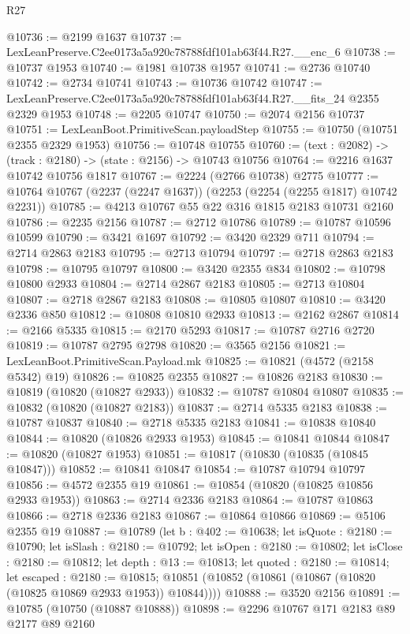 \begin{lexlean}{R27}
\begin{coremodule}
@10736 := @2199 @1637
@10737 := LexLeanPreserve.C2ee0173a5a920c78788fdf101ab63f44.R27.__enc_6
@10738 := @10737 @1953
@10740 := @1981 @10738 @1957
@10741 := @2736 @10740
@10742 := @2734 @10741
@10743 := @10736 @10742
@10747 := LexLeanPreserve.C2ee0173a5a920c78788fdf101ab63f44.R27.__fits_24 @2355 @2329 @1953
@10748 := @2205 @10747
@10750 := @2074 @2156 @10737
@10751 := LexLeanBoot.PrimitiveScan.payloadStep
@10755 := @10750 (@10751 @2355 @2329 @1953)
@10756 := @10748 @10755
@10760 := (text : @2082) -> (track : @2180) -> (state : @2156) -> @10743 @10756
@10764 := @2216 @1637 @10742 @10756 @1817
@10767 := @2224 (@2766 @10738) @2775
@10777 := @10764 @10767 (@2237 (@2247 @1637)) (@2253 (@2254 (@2255 @1817) @10742 @2231))
@10785 := @4213 @10767 @55 @22 @316 @1815 @2183 @10731 @2160
@10786 := @2235 @2156
@10787 := @2712 @10786
@10789 := @10787 @10596 @10599
@10790 := @3421 @1697
@10792 := @3420 @2329 @711
@10794 := @2714 @2863 @2183
@10795 := @2713 @10794
@10797 := @2718 @2863 @2183
@10798 := @10795 @10797
@10800 := @3420 @2355 @834
@10802 := @10798 @10800 @2933
@10804 := @2714 @2867 @2183
@10805 := @2713 @10804
@10807 := @2718 @2867 @2183
@10808 := @10805 @10807
@10810 := @3420 @2336 @850
@10812 := @10808 @10810 @2933
@10813 := @2162 @2867
@10814 := @2166 @5335
@10815 := @2170 @5293
@10817 := @10787 @2716 @2720
@10819 := @10787 @2795 @2798
@10820 := @3565 @2156
@10821 := LexLeanBoot.PrimitiveScan.Payload.mk
@10825 := @10821 (@4572 (@2158 @5342) @19)
@10826 := @10825 @2355
@10827 := @10826 @2183
@10830 := @10819 (@10820 (@10827 @2933))
@10832 := @10787 @10804 @10807
@10835 := @10832 (@10820 (@10827 @2183))
@10837 := @2714 @5335 @2183
@10838 := @10787 @10837
@10840 := @2718 @5335 @2183
@10841 := @10838 @10840
@10844 := @10820 (@10826 @2933 @1953)
@10845 := @10841 @10844
@10847 := @10820 (@10827 @1953)
@10851 := @10817 (@10830 (@10835 (@10845 @10847)))
@10852 := @10841 @10847
@10854 := @10787 @10794 @10797
@10856 := @4572 @2355 @19
@10861 := @10854 (@10820 (@10825 @10856 @2933 @1953))
@10863 := @2714 @2336 @2183
@10864 := @10787 @10863
@10866 := @2718 @2336 @2183
@10867 := @10864 @10866
@10869 := @5106 @2355 @19
@10887 := @10789
    (let b : @402 := @10638;
    let isQuote : @2180 := @10790;
    let isSlash : @2180 := @10792;
    let isOpen : @2180 := @10802;
    let isClose : @2180 := @10812;
    let depth : @13 := @10813;
    let quoted : @2180 := @10814;
    let escaped : @2180 := @10815;
    @10851 (@10852 (@10861 (@10867 (@10820 (@10825 @10869 @2933 @1953)) @10844))))
@10888 := @3520 @2156
@10891 := @10785 (@10750 (@10887 @10888))
@10898 := @2296 @10767 @171 @2183 @89 @2177 @89 @2160

\end{coremodule}
\end{lexlean}
